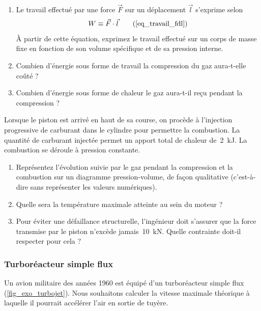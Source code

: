 	\begin{enumerate}
		\item Le travail effectué par une force $\vec F$ sur un déplacement $\vec l$ s’exprime selon
			\begin{equation}
				W \equiv \vec F \cdot \vec l 	\tag{\ref{eq_travail_fdl}}
			\end{equation}
			À partir de cette équation, exprimez le travail effectué sur un corps de masse fixe en fonction de son volume spécifique et de sa pression interne.
		\item Combien d’énergie sous forme de travail la compression du gaz aura-t-elle coûté ?
		\item Combien d’énergie sous forme de chaleur le gaz aura-t-il reçu pendant la compression ?
	\end{enumerate}

	Lorsque le piston est arrivé en haut de sa course, on procède à l’injection progressive de carburant dans le cylindre pour permettre la combustion. La quantité de carburant injectée permet un apport total de chaleur de~\SI{2}{\kilo\joule}. La combustion se déroule à pression constante.
	
	\begin{enumerate}
		\item Représentez l’évolution suivie par le gaz pendant la compression et la combustion sur un diagramme pression-volume, de façon qualitative (c’est-à-dire sans représenter les valeurs numériques).
		\item Quelle sera la température maximale atteinte au sein du moteur ?
		\item Pour éviter une défaillance structurelle, l’ingénieur doit s’assurer que la force transmise par le piston n’excède jamais~\SI{10}{\kilo\newton}. Quelle contrainte doit-il respecter pour cela ?
	\end{enumerate}
	

\subsubsection{Turboréacteur simple flux}
\label{exo_turboreacteur_simple_flux}

	Un avion militaire des années 1960 est équipé d’un turboréacteur simple flux (\cref{fig_exo_turbojet}). Nous souhaitons calculer la vitesse maximale théorique à laquelle il pourrait accélérer l’air en sortie de tuyère.
	
